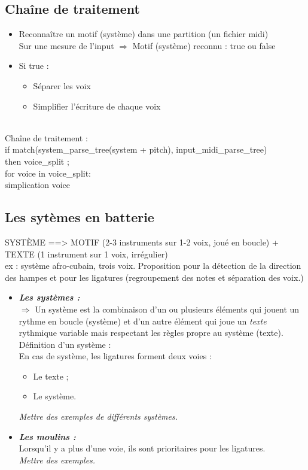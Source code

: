 \subsection{Chaîne de traitement}
\begin{itemize}
	\item Reconnaître un motif (système) dans une partition (un fichier midi)\\
	Sur une mesure de l’input $\Rightarrow$ Motif (système) reconnu : true ou false
	\item Si true : 
	\begin{itemize}
		\item Séparer les voix
		\item Simplifier l’écriture de chaque voix\\\\
	\end{itemize}
\end{itemize}
Chaîne de traitement :\\
if match(system\_parse\_tree(system + pitch), input\_midi\_parse\_tree)\\
\tab then voice\_split ;\\
\tab for voice in voice\_split:\\
\tab \tab simplication voice

\subsection*{Les sytèmes en batterie}
SYSTÈME ==> MOTIF (2-3 instruments sur 1-2 voix, joué en boucle) + TEXTE (1 instrument sur 1 voix, irrégulier)\\
ex : système afro-cubain, trois voix.
Proposition pour la détection de la direction des hampes et pour les ligatures (regroupement des notes et séparation des voix.)
\begin{itemize}
	\item \textbf{\textit{Les systèmes :}}\\
	$\Rightarrow$ Un système est la combinaison d’un ou plusieurs éléments qui jouent un rythme en boucle (système) et d’un autre élément qui joue un \textit{texte} rythmique variable mais respectant les règles propre au système (texte).\\
	Définition d’un système :\\
	
	En cas de système, les ligatures forment deux voies :
	\begin{itemize}
		\item Le texte ;
		\item Le système.
	\end{itemize}
	\textit{Mettre des exemples de différents systèmes.}
	\item \textbf{\textit{Les moulins :}}\\
	Lorsqu’il y a plus d’une voie, ils sont prioritaires pour les ligatures.\\
	\textit{Mettre des exemples.}\\
\end{itemize}
